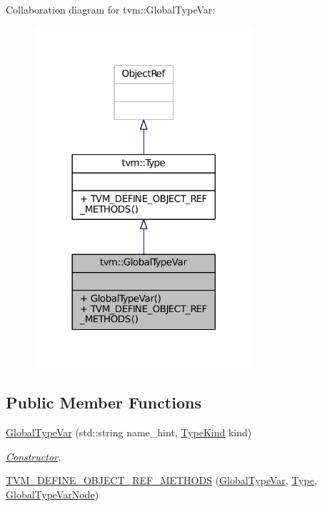 Collaboration diagram for tvm\+:\+:Global\+Type\+Var\+:
\nopagebreak
\begin{figure}[H]
\begin{center}
\leavevmode
\includegraphics[width=230pt]{classtvm_1_1GlobalTypeVar__coll__graph}
\end{center}
\end{figure}
\subsection*{Public Member Functions}
\begin{DoxyCompactItemize}
\item 
\hyperlink{classtvm_1_1GlobalTypeVar_a40e071918aaa0c43b2ef84fdf9ea567c}{Global\+Type\+Var} (std\+::string name\+\_\+hint, \hyperlink{namespacetvm_acd267f8d7f55da6ac681239831963279}{Type\+Kind} kind)
\begin{DoxyCompactList}\small\item\em \hyperlink{classtvm_1_1Constructor}{Constructor}. \end{DoxyCompactList}\item 
\hyperlink{classtvm_1_1GlobalTypeVar_a2c7ca980cffbbe9fbb1c24be59ba3b79}{T\+V\+M\+\_\+\+D\+E\+F\+I\+N\+E\+\_\+\+O\+B\+J\+E\+C\+T\+\_\+\+R\+E\+F\+\_\+\+M\+E\+T\+H\+O\+DS} (\hyperlink{classtvm_1_1GlobalTypeVar}{Global\+Type\+Var}, \hyperlink{classtvm_1_1Type}{Type}, \hyperlink{classtvm_1_1GlobalTypeVarNode}{Global\+Type\+Var\+Node})
\end{DoxyCompactItemize}


